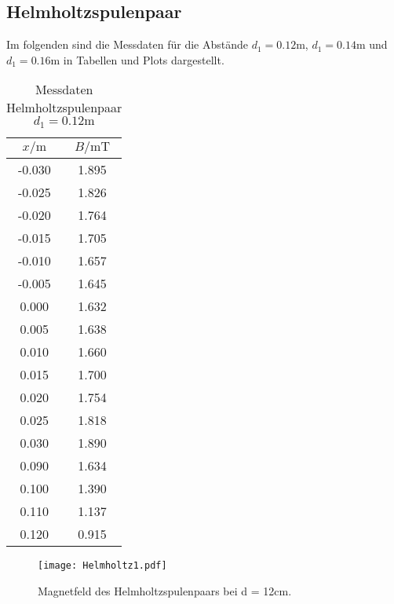 \subsection{Helmholtzspulenpaar}

Im folgenden sind die Messdaten für die Abstände $d_{1} = 0.12\unit\m$, $d_{1} = 0.14\unit\m$ und $d_{1} = 0.16\unit\m$ in Tabellen und Plots dargestellt.

\begin{table}
\centering
\caption{Messdaten Helmholtzspulenpaar $d_{1} = 0.12\unit\m$}
\begin{tabular}{c c}
  \toprule
  $x / \unit\m$ &  $B / \unit{\milli\tesla}$ \\
  \midrule
  -0.030 &        1.895 \\
  -0.025 &        1.826 \\
  -0.020 &        1.764 \\
  -0.015 &        1.705 \\
  -0.010 &        1.657 \\
  -0.005 &        1.645 \\
   0.000 &        1.632 \\
   0.005 &        1.638 \\
   0.010 &        1.660 \\
   0.015 &        1.700 \\
   0.020 &        1.754 \\
   0.025 &        1.818 \\
   0.030 &        1.890 \\
   0.090 &        1.634 \\
   0.100 &        1.390 \\
   0.110 &        1.137 \\
   0.120 &        0.915 \\
  \bottomrule
\end{tabular}
\end{table}

\begin{figure}
  \centering
  \texttt{[image: Helmholtz1.pdf]}
  \caption{Magnetfeld des Helmholtzspulenpaars bei d = 12cm.}
  \label{fig:Helmholtz1}
\end{figure}

